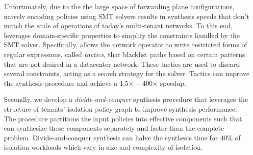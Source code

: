 Unfortunately, due to the the large space of forwarding plane
configurations, naively encoding policies using SMT solvers results in
synthesis speeds that don't match the scale of operations of today's
multi-tenant networks. 
To this
end, \Name leverages domain-specific properties to simplify the
constraints handled by the SMT solver.  Specifically, \Name allows the
network operator to write 
restricted forms of regular expressions, called \emph{tactics}, 
that blacklist
paths based on certain patterns   
that are not desired in a datacenter network. 
These tactics are used to discard several constraints, 
acting as a search strategy for the solver.
Tactics can improve the synthesis procedure and achieve
a 1.5$\times - $400$\times$ speedup. 

 Secondly, we develop a \emph{divide-and-conquer}
 synthesis
 procedure that leverages the structure of tenants'
 isolation policy graph to improve synthesis performance. The
  procedure partitions the input policies
  into effective components such that \name can 
  synthesize these components 
  separately and faster than the complete problem. 
 Divide-and-conquer synthesis can halve the
 synthesis time for 40\% of isolation workloads  
 which vary in size and complexity of isolation.



